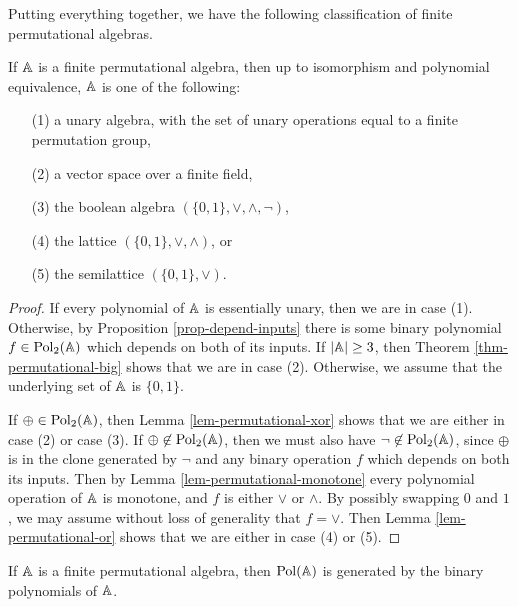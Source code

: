 \begin{appendices}
Putting everything together, we have the following classification of finite permutational algebras.

\begin{thm}\label{palfy-five-types} If $\mathbb{A}$ is a finite permutational algebra, then up to isomorphism and polynomial equivalence, $\mathbb{A}$ is one of the following:
\begin{itemize}
\item[(1)] a unary algebra, with the set of unary operations equal to a finite permutation group,

\item[(2)] a vector space over a finite field,

\item[(3)] the boolean algebra $(\{0,1\},\vee,\wedge,\neg)$,

\item[(4)] the lattice $(\{0,1\},\vee,\wedge)$, or

\item[(5)] the semilattice $(\{0,1\},\vee)$.
\end{itemize}
\end{thm}
\begin{proof} If every polynomial of $\mathbb{A}$ is essentially unary, then we are in case (1). Otherwise, by Proposition \ref{prop-depend-inputs} there is some binary polynomial $f \in \operatorname{Pol}_2(\mathbb{A})$ which depends on both of its inputs. If $|\mathbb{A}| \ge 3$, then Theorem \ref{thm-permutational-big} shows that we are in case (2). Otherwise, we assume that the underlying set of $\mathbb{A}$ is $\{0,1\}$.

If $\oplus \in \operatorname{Pol}_2(\mathbb{A})$, then Lemma \ref{lem-permutational-xor} shows that we are either in case (2) or case (3). If $\oplus \not\in \operatorname{Pol}_2(\mathbb{A})$, then we must also have $\neg \not\in \operatorname{Pol}_2(\mathbb{A})$, since $\oplus$ is in the clone generated by $\neg$ and any binary operation $f$ which depends on both its inputs. Then by Lemma \ref{lem-permutational-monotone} every polynomial operation of $\mathbb{A}$ is monotone, and $f$ is either $\vee$ or $\wedge$. By possibly swapping $0$ and $1$, we may assume without loss of generality that $f = \vee$. Then Lemma \ref{lem-permutational-or} shows that we are either in case (4) or (5).
\end{proof}

\begin{cor} If $\mathbb{A}$ is a finite permutational algebra, then $\operatorname{Pol}(\mathbb{A})$ is generated by the binary polynomials of $\mathbb{A}$.
\end{cor}


\end{appendices}
